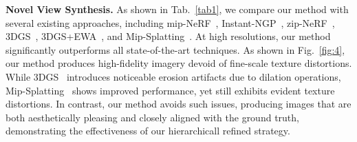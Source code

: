 
\noindent\textbf{Novel View Synthesis.}
As shown in Tab.~\ref{tab1}, we compare our method with several existing approaches, including mip-NeRF~\cite{Mip-NeRF360}, Instant-NGP~\cite{InstantNGP}, zip-NeRF~\cite{zip-nrf}, 3DGS~\cite{3dgs}, 3DGS+EWA~\cite{EWV}, and Mip-Splatting~\cite{mip360-splatting}. At high resolutions, our method significantly outperforms all state-of-the-art techniques.
As shown in Fig.~\ref{fig:4}, our method produces high-fidelity imagery devoid of fine-scale texture distortions.
While 3DGS~\cite{3dgs} introduces noticeable erosion artifacts due to dilation operations, Mip-Splatting~\cite{mip360-splatting} shows improved performance, yet still exhibits evident texture distortions. In contrast, our method avoids such issues, producing images that are both aesthetically pleasing and closely aligned with the ground truth, demonstrating the effectiveness of our hierarchicall refined strategy.











